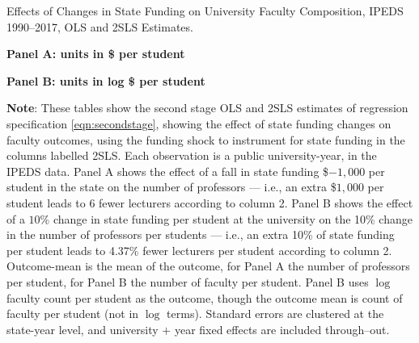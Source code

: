 \newpage
\begin{table}[H]
    \singlespacing
    \centering
    \caption{Effects of Changes in State Funding on University Faculty Composition, IPEDS 1990--2017, OLS and 2SLS Estimates.}

    \textbf{Panel A: units in \$ per student}

    \makebox[\textwidth][c]{}
    
    \textbf{Panel B: units in log \$ per student}
    
    \makebox[\textwidth][c]{}

    \label{tab:facultycount-shock-reg}
    \justify
    \footnotesize
    \textbf{Note}:
    These tables show the second stage OLS and 2SLS estimates of regression specification \eqref{eqn:secondstage}, showing the effect of state funding changes on faculty outcomes, using the funding shock to instrument for state funding in the columns labelled 2SLS.
    Each observation is a public university-year, in the IPEDS data.
    Panel A shows the effect of a fall in state funding \$$-1,000$ per student in the state on the number of professors --- i.e.,
    an extra \$$1,000$ per student leads to 6 fewer lecturers according to column 2.
    Panel B shows the effect of a $10$\% change in state funding per student at the university on the 10\% change in the number of professors per students --- i.e.,
    an extra 10\% of state funding per student leads to 4.37\% fewer lecturers per student according to column 2.
    Outcome-mean is the mean of the outcome, for Panel A the number of professors per student, for Panel B the number of faculty per student.
    Panel B uses $\log$ faculty count per student as the outcome, though the outcome mean is count of faculty per student (not in $\log$ terms).
    Standard errors are clustered at the state-year level, and university $+$ year fixed effects are included through--out.
\end{table}

